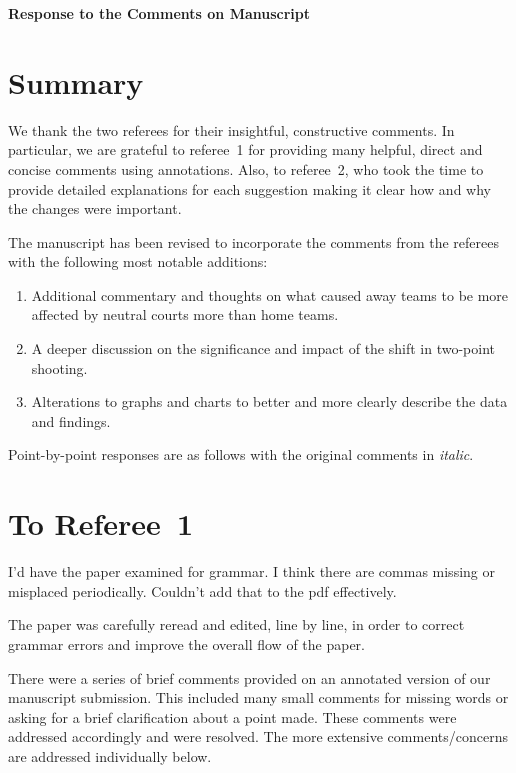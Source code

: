 \documentclass[12pt]{article}
\newenvironment{comment}%
{\begin{quoting}\noindent\small\it\ignorespaces%
  }{\end{quoting}}
\begin{document}
\begin{center}
  {\Large\bf Response to the Comments on Manuscript}
\end{center}

\section*{Summary}

We thank the two referees for their insightful, constructive
comments. In particular, we are grateful to referee~1 for providing
many helpful, direct and concise comments using annotations. Also, to
referee~2, who took the time to provide detailed explanations for each
suggestion making it clear how and why the changes were important.

The manuscript has been revised to incorporate the comments from the
referees with the following most notable additions:

\begin{enumerate}
\item
  Additional commentary and thoughts on what caused away teams to
  be more affected by neutral courts more than home teams.
  \item
  A deeper discussion on the significance and impact of the shift 
  in two-point shooting.
\item
  Alterations to graphs and charts to better and more clearly describe
  the data and findings.
\end{enumerate}

Point-by-point responses are as follows with the original comments in \emph{italic}.


\section*{To Referee~1}

\begin{comment}
  I’d have the paper examined for grammar.  I think there are commas missing or 
  misplaced periodically. Couldn’t add that to the pdf effectively.
\end{comment}

 The paper was carefully reread and edited, line by line, in order to
 correct grammar errors and improve the overall flow of the paper.
 

There were a series of brief comments provided on an annotated version of our
manuscript submission. This included many small comments for missing words or 
asking for a brief clarification about a point made. These comments were addressed
accordingly and were resolved. The more extensive comments/concerns are addressed 
individually below.
\end{document}
